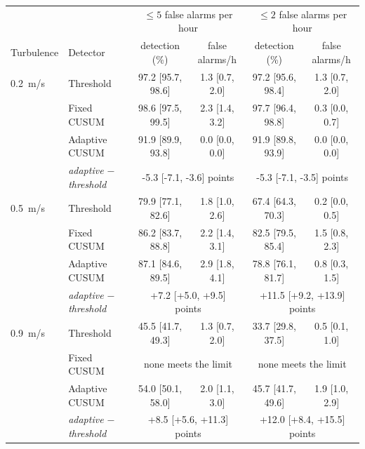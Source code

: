 \begin{tabular}{@{}llcccc@{}}
\toprule
 & & \multicolumn{2}{c}{$\le5$ false alarms per hour} & \multicolumn{2}{c}{$\le2$ false alarms per hour} \\
Turbulence & Detector & detection (\%) & false alarms/h & detection (\%) & false alarms/h \\
\midrule
0.2~m/s & Threshold & 97.2 [95.7, 98.6] & 1.3 [0.7, 2.0] & 97.2 [95.6, 98.4] & 1.3 [0.7, 2.0] \\
 & Fixed CUSUM & 98.6 [97.5, 99.5] & 2.3 [1.4, 3.2] & 97.7 [96.4, 98.8] & 0.3 [0.0, 0.7] \\
 & Adaptive CUSUM & 91.9 [89.9, 93.8] & 0.0 [0.0, 0.0] & 91.9 [89.8, 93.9] & 0.0 [0.0, 0.0] \\
 & \textit{adaptive $-$ threshold} & \multicolumn{2}{c}{-5.3 [-7.1, -3.6] points} & \multicolumn{2}{c}{-5.3 [-7.1, -3.5] points} \\
\midrule
0.5~m/s & Threshold & 79.9 [77.1, 82.6] & 1.8 [1.0, 2.6] & 67.4 [64.3, 70.3] & 0.2 [0.0, 0.5] \\
 & Fixed CUSUM & 86.2 [83.7, 88.8] & 2.2 [1.4, 3.1] & 82.5 [79.5, 85.4] & 1.5 [0.8, 2.3] \\
 & Adaptive CUSUM & 87.1 [84.6, 89.5] & 2.9 [1.8, 4.1] & 78.8 [76.1, 81.7] & 0.8 [0.3, 1.5] \\
 & \textit{adaptive $-$ threshold} & \multicolumn{2}{c}{+7.2 [+5.0, +9.5] points} & \multicolumn{2}{c}{+11.5 [+9.2, +13.9] points} \\
\midrule
0.9~m/s & Threshold & 45.5 [41.7, 49.3] & 1.3 [0.7, 2.0] & 33.7 [29.8, 37.5] & 0.5 [0.1, 1.0] \\
 & Fixed CUSUM & \multicolumn{2}{c}{none meets the limit} & \multicolumn{2}{c}{none meets the limit} \\
 & Adaptive CUSUM & 54.0 [50.1, 58.0] & 2.0 [1.1, 3.0] & 45.7 [41.7, 49.6] & 1.9 [1.0, 2.9] \\
 & \textit{adaptive $-$ threshold} & \multicolumn{2}{c}{+8.5 [+5.6, +11.3] points} & \multicolumn{2}{c}{+12.0 [+8.4, +15.5] points} \\
\bottomrule
\end{tabular}
